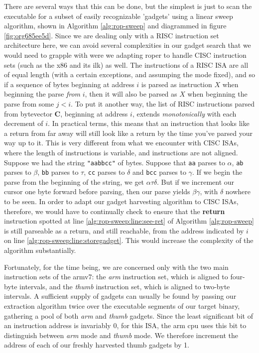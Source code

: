 \documentclass[12pt,glossary]{dalthesis}
\begin{document}
There are several ways that this can be done, but the simplest is just to
scan the executable for a subset of easily recognizable 'gadgets' using a
linear sweep algorithm, shown in Algorithm \ref{alg:rop-sweep} and diagrammed 
in figure \ref{fig:org685ee5d}. Since we are
dealing only with a RISC instruction set architecture here, we can avoid 
several complexities in our gadget search that we would need to grapple with
were we adapting \gls{roper} to handle CISC instruction sets (such as the x86 and
its ilk) as well. The instructions of a RISC ISA are all of equal length
(with a certain exceptions, and assumping the mode fixed), and so if a
sequence of bytes beginning at address \(i\) is parsed as instruction \(X\)
when beginning the parse \emph{from} \(i\), then it will also be parsed as \(X\)
when beginning the parse from some \(j < i\). To put it another way, the
list of RISC instructions parsed from bytevector \(\mathbf{C}\), beginning
at address \(i\), extends \emph{monotonically} with each decrement of \(i\).
In practical terms, this means that an instruction that looks like a
return from far away will still look like a return by the time you've parsed your
way up to it. This is very different from what we encounter with CISC ISAs,
where the length of instructions is variable, and instructions are not aligned.
Suppose we had the string \texttt{"aabbcc"} of bytes. Suppose that \texttt{aa} parses to
\(\alpha\), \texttt{ab} parses to \(\beta\), \texttt{bb} parses to \(\tau\), \texttt{cc} parses to \(\delta\) and
\texttt{bcc} parses to \(\gamma\). If we begin the parse from the beginning of the string,
we get \(\alpha \tau \delta\). But if we increment our cursor one byte forward
before parsing, then our parse yields \(\beta \gamma\), with \(\delta\) nowhere
to be seen. In order to adapt our gadget harvesting algorithm to CISC ISAs,
therefore, we would have to continually check to ensure that the \textbf{return}
instruction spotted at line \ref{alg:rop-sweep:line:see-ret} of
Algorithm \ref{alg:rop-sweep} is still parseable as a return, and still reachable, from
the address indicated by \(i\) on line \ref{alg:rop-sweep:line:storegadget}. This
would increase the complexity of the algorithm substantially. 

Fortunately, for the time being, we are concerned only with the two main instruction
sets of the \gls{armv7}: the \emph{arm} instruction set, which is aligned to four-byte intervals, 
and the \emph{thumb} instruction set, which is aligned to two-byte intervals. A sufficient
supply of gadgets can usually be found by passing our extraction algorithm twice
over the executable segments of our target binary, gathering a pool of both \emph{arm}
and \emph{thumb} gadgets. Since the least significant bit of an instruction address is
invariably 0, for this ISA, the \gls{arm} \gls{cpu} uses this bit to distinguish between \emph{arm}
mode and \emph{thumb} mode. We therefore increment the address of each of our freshly
harvested thumb gadgets by 1.
\end{document}
